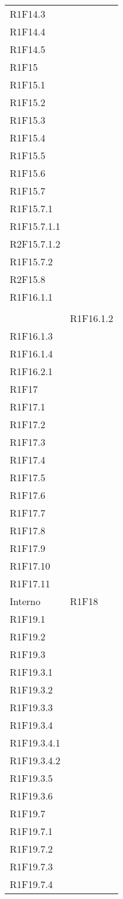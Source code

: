 \begin{longtable}{ >{\centering}p{}
			>{\centering}p{}}
	R1F14.3\\ 
	R1F14.4\\ 
	R1F14.5\\ 
	R1F15\\ 
	R1F15.1\\ 
	R1F15.2\\ 
	R1F15.3\\ 
	R1F15.4\\ 
	R1F15.5\\ 
	R1F15.6\\ 
	R1F15.7\\ 
	R1F15.7.1\\ 
	R1F15.7.1.1\\ 
	R2F15.7.1.2\\ 
	R1F15.7.2\\ 
	R2F15.8\\ 
	R1F16.1.1 \tabularnewline \rowcolordark &
	\tabularnewline & 
	R1F16.1.2\\
	R1F16.1.3\\ 
	R1F16.1.4\\ 
	R1F16.2.1\\ 
	R1F17\\ 
	R1F17.1\\ 
	R1F17.2\\ 
	R1F17.3\\ 
	R1F17.4\\ 
	R1F17.5\\ 
	R1F17.6\\ 
	R1F17.7\\ 
	R1F17.8\\ 
	R1F17.9\\ 
	R1F17.10\\ 
	R1F17.11 \tabularnewline
	Interno	&	
	R1F18\\ 
	R1F19.1\\ 
	R1F19.2\\ 
	R1F19.3\\ 
	R1F19.3.1\\ 
	R1F19.3.2\\ 
	R1F19.3.3\\ 
	R1F19.3.4\\ 
	R1F19.3.4.1\\ 
	R1F19.3.4.2\\ 
	R1F19.3.5\\ 
	R1F19.3.6\\ 
	R1F19.7\\ 
	R1F19.7.1\\ 
	R1F19.7.2\\ 
	R1F19.7.3\\ 
	R1F19.7.4\\ 

\end{longtable}
